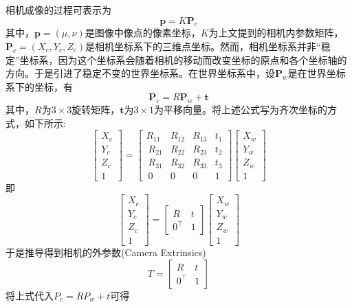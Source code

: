 相机成像的过程可表示为
$$ \bm{p} = K\bm{P}_{c} $$
其中，$\bm{p}=(\mu, \nu)$是图像中像点的像素坐标，$K$为上文提到的相机内参数矩阵，$\bm{P}_{c}=(X_{c}, Y_{c}, Z_{c})$是相机坐标系下的三维点坐标。然而，相机坐标系并非“稳定”坐标系，因为这个坐标系会随着相机的移动而改变坐标的原点和各个坐标轴的方向。于是引进了稳定不变的世界坐标系。在世界坐标系中，设$\bm{P}_{w}$是在世界坐标系下的坐标，有
$$ \bm{P}_{c} = R\bm{P}_{w} + \bm{t} $$
其中，$R$为$3 \times 3$旋转矩阵，$\bm{t}$为$3 \times 1$为平移向量。将上述公式写为齐次坐标的方式，如下所示:
\begin{equation*}
  \left[
    \begin{array}{c}X_c\\Y_c\\Z_c\\1\end{array}
  \right] 
  = 
  \left[
    \begin{matrix}
      R_{11} & R_{12} & R_{13} & t_1 \\\
      R_{21} & R_{22} & R_{23} & t_2 \\\
      R_{31} & R_{32} & R_{33} & t_3 \\\
      0 & 0 & 0 & 1
    \end{matrix}
  \right]
  \left[
    \begin{array}{c}X_w\\Y_w\\Z_w\\1\end{array}
  \right]
\end{equation*}
即
\begin{equation*}
\left[
  \begin{array}{c}X_c\\Y_c\\Z_c\\1\end{array}
\right] = 
\left[
  \begin{matrix}R&t\\0^\top&1\end{matrix}
\right]
\left[
  \begin{array}{c}X_w\\Y_w\\Z_w\\1\end{array}
\right]
\end{equation*}
于是推导得到相机的外参数(Camera Extrinsics)
\begin{equation*}
T = \left[\begin{matrix}R&t\\0^\top&1\end{matrix}\right]
\end{equation*}
将上式代入$ P_{c} = RP_{w} + t $可得

